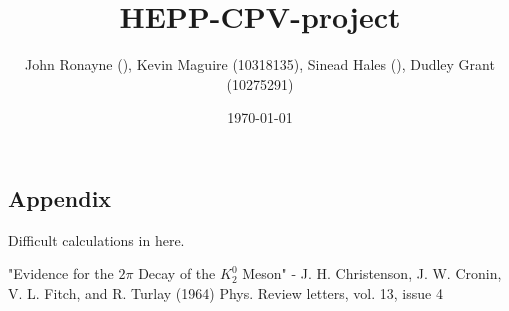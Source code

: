 \documentclass[twocolumn,floatfix,aps,prd,amsmath,amssymb]{revtex4}
\begin{document}
\title{HEPP-CPV-project}
\author{John Ronayne (), Kevin Maguire (10318135), Sinead Hales (), Dudley Grant (10275291)}
\date{\today}

\begin{abstract}
\textit{}
\end{abstract}

\maketitle
{}
 











\begin{appendix}
\section{Appendix}
Difficult calculations in here.
\end{appendix}
 
\begin{thebibliography}{10}
"Evidence for the $2 \pi$ Decay of the $K^0_2$ Meson" - J. H. Christenson, J. W. Cronin, V. L. Fitch, and R. Turlay (1964) Phys. Review letters, vol. 13, issue 4

\end{thebibliography}
\end{document}
